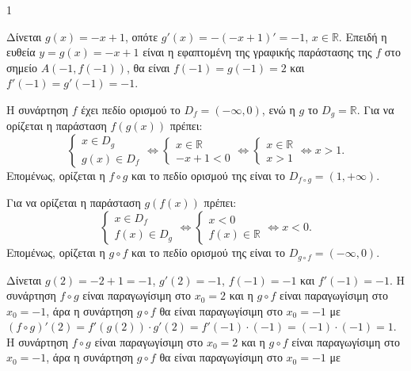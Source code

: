 \begin{ylh}{1}
    \item []
\end{ylh}
\begin{alist}
\item [$\boldsymbol{\alpha}$)] Δίνεται $g(x)=-x+1$, οπότε $g'(x)=-(-x+1)'=-1$, $x \in \mathbb{R}$.
Επειδή η ευθεία $y=g(x)=-x+1$ είναι η εφαπτομένη της γραφικής παράστασης της $f$ στο σημείο $A(-1, f(-1))$, θα είναι
$f(-1)=g(-1)=2$ και $f'(-1)=g'(-1)=-1$.
\item [$\boldsymbol{\beta}$)]
\begin{rlist}
\item Η συνάρτηση $f$ έχει πεδίο ορισμού το $D_f = (-\infty, 0)$, ενώ η $g$ το $D_g = \mathbb{R}$.
Για να ορίζεται η παράσταση $f(g(x))$ πρέπει:
\[ \left\{ \begin{array}{l} x \in D_g \\ g(x) \in D_f \end{array} \right. \Leftrightarrow \left\{ \begin{array}{l} x \in \mathbb{R} \\ -x+1 < 0 \end{array} \right. \Leftrightarrow \left\{ \begin{array}{l} x \in \mathbb{R} \\ x > 1 \end{array} \right. \Leftrightarrow x > 1. \]
Επομένως, ορίζεται η $f \circ g$ και το πεδίο ορισμού της είναι το $D_{f \circ g} = (1, +\infty)$.
\item Για να ορίζεται η παράσταση $g(f(x))$ πρέπει:
\[ \left\{ \begin{array}{l} x \in D_f \\ f(x) \in D_g \end{array} \right. \Leftrightarrow \left\{ \begin{array}{l} x < 0 \\ f(x) \in \mathbb{R} \end{array} \right. \Leftrightarrow x < 0. \]
Επομένως, ορίζεται η $g \circ f$ και το πεδίο ορισμού της είναι το $D_{g \circ f} = (-\infty, 0)$.
\item Δίνεται $g(2)=-2+1=-1$, $g'(2)=-1$, $f(-1)=-1$ και $f'(-1)=-1$.
Η συνάρτηση $f \circ g$ είναι παραγωγίσιμη στο $x_0=2$ και η $g \circ f$ είναι παραγωγίσιμη στο $x_0=-1$, άρα η συνάρτηση $g \circ f$ θα είναι παραγωγίσιμη στο $x_0 = -1$ με
$(f \circ g)'(2) = f'(g(2)) \cdot g'(2) = f'(-1) \cdot (-1) = (-1) \cdot (-1) = 1$.
Η συνάρτηση $f \circ g$ είναι παραγωγίσιμη στο $x_0 = 2$ και η $g \circ f$ είναι παραγωγίσιμη στο $x_0 = -1$, άρα η συνάρτηση $g \circ f$ θα είναι παραγωγίσιμη στο $x_0 = -1$ με

\end{rlist}
\end{alist}
